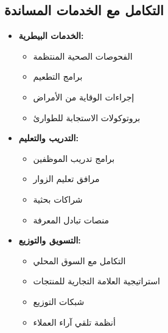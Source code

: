 \subsection{التكامل مع الخدمات المساندة}
\begin{itemize}
    \item \textbf{الخدمات البيطرية:}
    \begin{itemize}
        \item الفحوصات الصحية المنتظمة
        \item برامج التطعيم
        \item إجراءات الوقاية من الأمراض
        \item بروتوكولات الاستجابة للطوارئ
    \end{itemize}
    
    \item \textbf{التدريب والتعليم:}
    \begin{itemize}
        \item برامج تدريب الموظفين
        \item مرافق تعليم الزوار
        \item شراكات بحثية
        \item منصات تبادل المعرفة
    \end{itemize}
    
    \item \textbf{التسويق والتوزيع:}
    \begin{itemize}
        \item التكامل مع السوق المحلي
        \item استراتيجية العلامة التجارية للمنتجات
        \item شبكات التوزيع
        \item أنظمة تلقي آراء العملاء
    \end{itemize}
\end{itemize}

